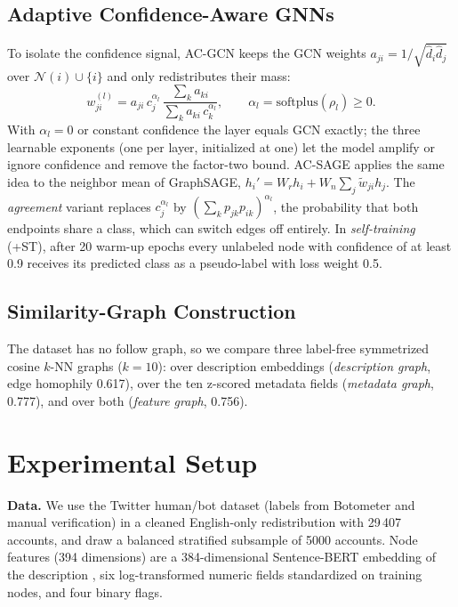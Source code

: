 \documentclass[conference,a4paper]{IEEEtran}
\begin{document}
\subsection{Adaptive Confidence-Aware GNNs}
To isolate the confidence signal, AC-GCN keeps the GCN weights $a_{ji}=1/\sqrt{\hat d_i\hat d_j}$ over $\mathcal{N}(i)\cup\{i\}$ and only redistributes their mass:
\begin{equation}
w_{ji}^{(l)}=a_{ji}\,c_j^{\alpha_l}\,\frac{\sum_k a_{ki}}{\sum_k a_{ki}\,c_k^{\alpha_l}},\qquad \alpha_l=\mathrm{softplus}(\rho_l)\ge 0 .
\label{eq:acgcn}
\end{equation}
With $\alpha_l=0$ or constant confidence the layer equals GCN exactly; the three learnable exponents (one per layer, initialized at one) let the model amplify or ignore confidence and remove the factor-two bound. AC-SAGE applies the same idea to the neighbor mean of GraphSAGE, $h_i'=W_rh_i+W_n\sum_j \tilde w_{ji}h_j$. The \emph{agreement} variant replaces $c_j^{\alpha_l}$ by $(\sum_k p_{jk}p_{ik})^{\alpha_l}$, the probability that both endpoints share a class, which can switch edges off entirely. In \emph{self-training} (+ST), after 20 warm-up epochs every unlabeled node with confidence of at least 0.9 receives its predicted class as a pseudo-label with loss weight 0.5.

\subsection{Similarity-Graph Construction}
The dataset has no follow graph, so we compare three label-free symmetrized cosine $k$-NN graphs ($k=10$): over description embeddings (\emph{description graph}, edge homophily 0.617), over the ten z-scored metadata fields (\emph{metadata graph}, 0.777), and over both (\emph{feature graph}, 0.756).

\section{Experimental Setup}
\textbf{Data.} We use the Twitter human/bot dataset \cite{gutierrez2021twitter} (labels from Botometer and manual verification) in a cleaned English-only redistribution \cite{botani2024} with 29\,407 accounts, and draw a balanced stratified subsample of 5000 accounts. Node features (394 dimensions) are a 384-dimensional Sentence-BERT embedding of the description \cite{reimers2019sbert}, six log-transformed numeric fields standardized on training nodes, and four binary flags.
\end{document}
